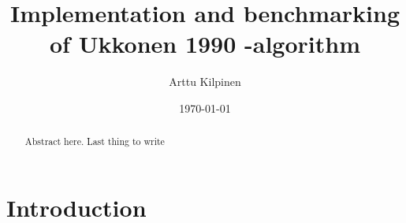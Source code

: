 \documentclass[english,twoside,censored,csm,algorithms-track-2020]{HYthesisML}
\title{Implementation and benchmarking of Ukkonen 1990 -algorithm}
\author{Arttu Kilpinen}
\date{\today}
\theoremstyle{plain}
\theoremstyle{definition}
\begin{document}
\maketitle



\begin{abstract}

  Abstract here. Last thing to write

\end{abstract}

\newpage
\mytableofcontents
\mainmatter


%
%
%
%



\chapter{Introduction}~\label{chp-intro}


\end{document}
